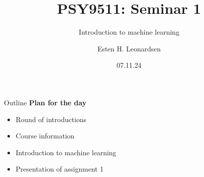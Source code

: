 \documentclass[10pt]{beamer}
\title{PSY9511: Seminar 1}
\subtitle{Introduction to machine learning}
\author{Esten H. Leonardsen}
\date{07.11.24}
\begin{document}
	\begin{frame}
	 	\maketitle
	\end{frame}

    \begin{frame}{Outline}
        \textbf{Plan for the day}
        \begin{itemize}
            \item Round of introductions
            \item Course information
            \item Introduction to machine learning
            \item Presentation of assignment 1
        \end{itemize}
    \end{frame}

    
    
\end{document}
